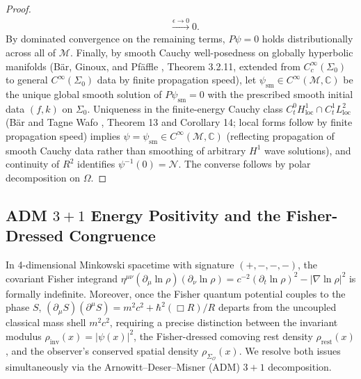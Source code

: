 \documentclass[11pt, a4paper]{article}
\theoremstyle{definition}
\begin{document}
\begin{proof}
\begin{equation}
\begin{aligned}
&\xrightarrow{\epsilon \to 0} 0.
\end{aligned}
\end{equation}
By dominated convergence on the remaining terms, $P\psi = 0$ holds distributionally across all of $\mathcal{M}$. Finally, by smooth Cauchy well-posedness on globally hyperbolic manifolds (B\"{a}r, Ginoux, and Pf\"{a}ffle \cite{BarGinouxPfaffle2007}, Theorem 3.2.11, extended from $C^\infty_c(\Sigma_0)$ to general $C^\infty(\Sigma_0)$ data by finite propagation speed), let $\psi_{\text{sm}} \in C^\infty(\mathcal{M}, \mathbb{C})$ be the unique global smooth solution of $P\psi_{\text{sm}} = 0$ with the prescribed smooth initial data $(f, k)$ on $\Sigma_0$. Uniqueness in the finite-energy Cauchy class $C^0_t H^1_{\text{loc}} \cap C^1_t L^2_{\text{loc}}$ (B\"{a}r and Tagne Wafo \cite{Bar2015}, Theorem 13 and Corollary 14; local forms follow by finite propagation speed) implies $\psi = \psi_{\text{sm}} \in C^\infty(\mathcal{M}, \mathbb{C})$ (reflecting propagation of smooth Cauchy data rather than smoothing of arbitrary $H^1$ wave solutions), and continuity of $R^2$ identifies $\psi^{-1}(0) = \mathcal{N}$. The converse follows by polar decomposition on $\Omega$.
\end{proof}

\subsection{ADM \texorpdfstring{$3+1$}{3+1} Energy Positivity and the Fisher-Dressed Congruence}
\label{sec:adm_positivity}

In 4-dimensional Minkowski spacetime with signature $(+,-,-,-)$, the covariant Fisher integrand $\eta^{\mu\nu}(\partial_\mu \ln\rho)(\partial_\nu \ln\rho) = c^{-2}(\partial_t \ln\rho)^2 - |\nabla \ln\rho|^2$ is formally indefinite. Moreover, once the Fisher quantum potential couples to the phase $S$, $(\partial_\mu S)(\partial^\mu S) = m^2 c^2 + \hbar^2(\Box R)/R$ departs from the uncoupled classical mass shell $m^2 c^2$, requiring a precise distinction between the invariant modulus $\rho_{\text{inv}}(x) = |\psi(x)|^2$, the Fisher-dressed comoving rest density $\rho_{\text{rest}}(x)$, and the observer's conserved spatial density $\rho_{\Sigma_{\mathcal{O}}}(x)$. We resolve both issues simultaneously via the Arnowitt--Deser--Misner (ADM) $3+1$ decomposition.
\end{document}
